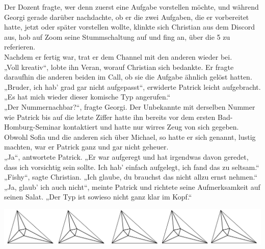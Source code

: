 \documentclass[oneside]{memoir}
\newcommand{\parasep}{
\bigskip
\bigskip
\begin{center} 
   \includegraphics[scale=.08]{parasep5.jpg} 
\end{center}
\bigskip
\bigskip
}
\begin{document}
Der Dozent fragte, wer denn zuerst eine Aufgabe vorstellen möchte, und während Georgi gerade darüber nachdachte, ob er die zwei Aufgaben, die er vorbereitet hatte, jetzt oder später vorstellen wollte, klinkte sich Christian aus dem Discord aus, hob auf Zoom seine Stummschaltung auf und fing an, über die 5 zu referieren.  \\
Nachdem er fertig war, trat er dem Channel mit den anderen wieder bei. \\
„Voll kreativ“, lobte ihn Veran, worauf Christian sich bedankte. Er fragte daraufhin die anderen beiden im Call, ob sie die Aufgabe ähnlich gelöst hatten. \\
„Bruder, ich hab' grad gar nicht aufgepasst“, erwiderte Patrick leicht aufgebracht. „Es hat mich wieder dieser komische Typ angerufen.“ \\
„Der Nummernachbar?“, fragte Georgi. Der Unbekannte mit derselben Nummer wie Patrick bis auf die letzte Ziffer hatte ihn bereits vor dem ersten Bad-Homburg-Seminar kontaktiert und hatte nur wirres Zeug von sich gegeben. Obwohl Sofia und die anderen sich über Michael, so hatte er sich genannt, lustig machten, war er Patrick ganz und gar nicht geheuer. \\
„Ja“, antwortete Patrick. „Er war aufgeregt und hat irgendwas davon geredet, dass ich vorsichtig sein sollte. Ich hab' einfach aufgelegt, ich fand das zu seltsam.“ \\
„Fishy“, sagte Christian. „Ich glaube, du brauchst das nicht allzu ernst nehmen.“ \\
„Ja, glaub' ich auch nicht“, meinte Patrick und richtete seine Aufmerksamkeit auf seinen Salat. „Der Typ ist sowieso nicht ganz klar im Kopf.“

\parasep
\end{document}
